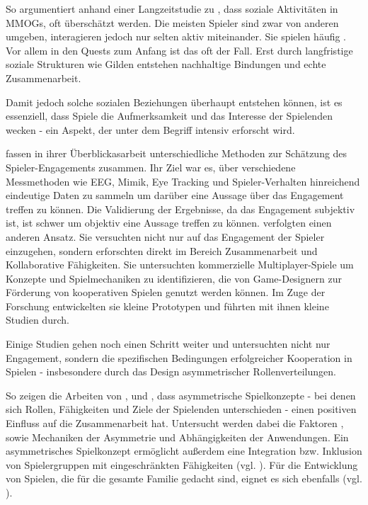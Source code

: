 So argumentiert \cite{ducheneaut_alone_2006} anhand einer Langzeitstudie zu , dass soziale Aktivitäten in \ac{MMOG}s, oft überschätzt werden. Die meisten Spieler sind zwar von anderen umgeben, interagieren jedoch nur selten aktiv miteinander. Sie spielen häufig . Vor allem in den Quests zum Anfang ist das oft der Fall. Erst durch langfristige soziale Strukturen wie Gilden entstehen nachhaltige Bindungen und echte Zusammenarbeit.

Damit jedoch solche sozialen Beziehungen überhaupt entstehen können, ist es essenziell, dass Spiele die Aufmerksamkeit und das Interesse der Spielenden wecken - ein Aspekt, der unter dem Begriff  intensiv erforscht wird.

\cite{rashed_review_2025} fassen in ihrer Überblickasarbeit unterschiedliche Methoden zur Schätzung des Spieler-Engagements zusammen. Ihr Ziel war es, über verschiedene Messmethoden wie EEG, Mimik, Eye Tracking und Spieler-Verhalten hinreichend eindeutige Daten zu sammeln um darüber eine Aussage über das Engagement treffen zu können. Die Validierung der Ergebnisse, da das Engagement subjektiv ist, ist schwer um objektiv eine  Aussage treffen zu können.  \cite{yu_video_2023} verfolgten einen anderen Ansatz. Sie versuchten nicht nur auf das Engagement der Spieler einzugehen, sondern erforschten direkt im Bereich Zusammenarbeit und Kollaborative Fähigkeiten. Sie untersuchten kommerzielle Multiplayer-Spiele um Konzepte und Spielmechaniken zu identifizieren, die von Game-Designern zur Förderung von kooperativen Spielen genutzt werden können. Im Zuge der Forschung entwickelten sie kleine Prototypen und führten mit ihnen kleine Studien durch. 

Einige Studien gehen noch einen Schritt weiter und untersuchten nicht nur Engagement, sondern die spezifischen Bedingungen erfolgreicher Kooperation in Spielen - insbesondere durch das Design asymmetrischer Rollenverteilungen.

So zeigen die Arbeiten von \cite{harris_beam_2014}, \cite{harris_leveraging_2016} und \cite{harris_asymmetry_2019}, dass asymmetrische Spielkonzepte - bei denen sich Rollen, Fähigkeiten und Ziele der Spielenden unterschieden - einen positiven Einfluss auf die Zusammenarbeit hat. Untersucht werden dabei die Faktoren ,  sowie Mechaniken der Asymmetrie und Abhängigkeiten der Anwendungen. Ein asymmetrisches Spielkonzept ermöglicht außerdem eine Integration bzw. Inklusion von Spielergruppen mit eingeschränkten Fähigkeiten (vgl. \cite{goncalves_exploring_2021}). Für die Entwicklung von Spielen, die für die gesamte Familie gedacht sind, eignet es sich ebenfalls (vgl. \cite{pais_promoting_2024}).

